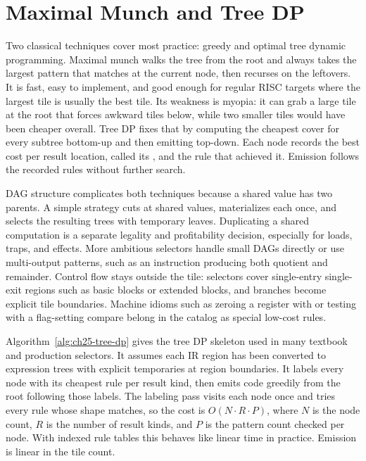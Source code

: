 \section{Maximal Munch and Tree DP}\label{sec:ch25-techniques}

Two classical techniques cover most practice: greedy  and optimal tree dynamic programming.
Maximal munch walks the tree from the root and always takes the largest pattern that matches at the current node, then recurses on the leftovers.
It is fast, easy to implement, and good enough for regular RISC targets where the largest tile is usually the best tile.
Its weakness is myopia: it can grab a large tile at the root that forces awkward tiles below, while two smaller tiles would have been cheaper overall.
Tree DP fixes that by computing the cheapest cover for every subtree bottom-up and then emitting top-down.
Each node records the best cost per result location, called its , and the rule that achieved it.
Emission follows the recorded rules without further search.

DAG structure complicates both techniques because a shared value has two parents.
A simple strategy cuts at shared values, materializes each once, and selects the resulting trees with temporary leaves.
Duplicating a shared computation is a separate legality and profitability decision, especially for loads, traps, and effects.
More ambitious selectors handle small DAGs directly or use multi-output patterns, such as an instruction producing both quotient and remainder.
Control flow stays outside the tile: selectors cover single-entry single-exit regions such as basic blocks or extended blocks, and branches become explicit tile boundaries.
Machine idioms such as zeroing a register with  or testing with a flag-setting compare belong in the catalog as special low-cost rules.

Algorithm~\ref{alg:ch25-tree-dp} gives the tree DP skeleton used in many textbook and production selectors.
It assumes each IR region has been converted to expression trees with explicit temporaries at region boundaries.
It labels every node with its cheapest rule per result kind, then emits code greedily from the root following those labels.
The labeling pass visits each node once and tries every rule whose shape matches, so the cost is $O(N \cdot R \cdot P)$, where $N$ is the node count, $R$ is the number of result kinds, and $P$ is the pattern count checked per node.
With indexed rule tables this behaves like linear time in practice.
Emission is linear in the tile count.

